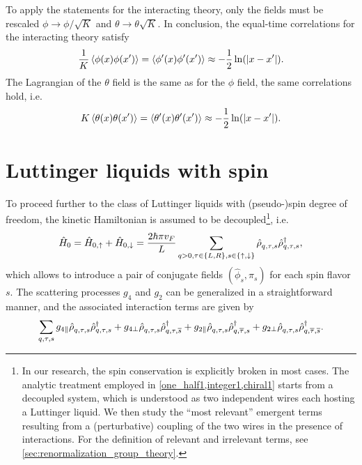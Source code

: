 To apply the statements for the interacting theory, only the fields must be rescaled $\phi\rightarrow\phi/\sqrt K$ and $\theta\rightarrow\theta\sqrt K$.
In conclusion, the equal-time correlations for the interacting theory satisfy
\begin{align}
    \frac1K\braket{\phi(x)\phi(x')} = \braket{\phi'(x)\phi'(x')} \approx -\frac12\ln(|x-x'|).
    \label{eq:greens_1}
\end{align}
The Lagrangian of the $\theta$ field is the same as for the $\phi$ field, the same correlations hold, i.e.
\begin{align}
    K\braket{\theta(x)\theta(x')} = \braket{\theta'(x)\theta'(x')} \approx -\frac12\ln(|x-x'|).
    \label{eq:greens_2}
\end{align}
%
%
\section{Luttinger liquids with spin}
\label{sec:LL_with_spin}
To proceed further to the class of Luttinger liquids with (pseudo-)spin degree of freedom, the kinetic Hamiltonian is assumed to be decoupled\footnote{In our research, the spin conservation is explicitly broken in most cases. The analytic treatment employed in \cref{one_half1,integer1,chiral1} starts from a decoupled system, which is understood as two independent wires each hosting a Luttinger liquid. We then study the ``most relevant'' emergent terms resulting from a (perturbative) coupling of the two wires in the presence of interactions. For the definition of relevant and irrelevant terms, see \cref{sec:renormalization_group_theory}.}, i.e.
\begin{align}
    \hat H_0 = \hat H_{0,\uparrow}+\hat H_{0,\downarrow}
    = \frac{2\hbar\pi v_F}L\sum_{q>0,\tau\in\{L,R\},s\in\{\uparrow,\downarrow\}}\hat\rho^\pdag_{q,\tau,s}\hat\rho^\dag_{q,\tau,s},
\end{align}
which allows to introduce a pair of conjugate fields $(\hat \phi_s,\hat \pi_s)$ for each spin flavor $s$.
The scattering processes $g_4$ and $g_2$ can be generalized in a straightforward manner, and the associated interaction terms are given by
\begin{align}
  \sum_{q,\tau,s}
  g_{4\parallel}\hat\rho^\pdag_{q,\tau,s}\hat\rho^\dag_{q,\tau,s}
  +
  g_{4\perp}\hat\rho^\pdag_{q,\tau,s}\hat\rho^\dag_{q,\tau,\overline s}
  +
  g_{2\parallel}\hat\rho^\pdag_{q,\tau,s}\hat\rho^\dag_{q,\overline\tau,s}
  +
  g_{2\perp}\hat\rho^\pdag_{q,\tau,s}\hat\rho^\dag_{q,\overline\tau,\overline s}.
\end{align}
